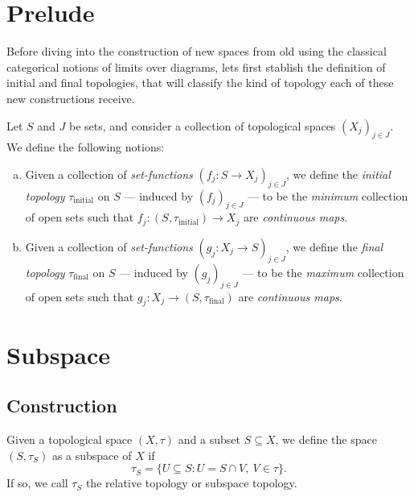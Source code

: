 \section{Prelude}

Before diving into the construction of new spaces from old using the classical
categorical notions of limits over diagrams, lets first stablish the definition
of initial and final topologies, that will classify the kind of topology each of
these new constructions receive.

\begin{definition}
\label{def:initial-final-topology}
Let \(S\) and \(J\) be sets, and consider a collection of topological spaces
\((X_j)_{j \in J}\). We define the following notions:
\begin{enumerate}[(a)]\setlength\itemsep{0em}
\item Given a collection of \emph{set-functions} \((f_j: S \to X_j)_{j \in J}\),
  we define the \emph{initial topology} \(\tau_{\text{initial}}\) on \(S\) ---
  induced by \((f_j)_{j \in J}\) --- to be the \emph{minimum} collection of open
  sets such that \(f_j: (S, \tau_{\text{initial}}) \to X_j\) are
  \emph{continuous maps}.
\item Given a collection of \emph{set-functions} \((g_j: X_j \to S)_{j \in J}\),
  we define the \emph{final topology} \(\tau_{\text{final}}\) on \(S\) ---
  induced by \((g_j)_{j \in J}\) --- to be the \emph{maximum} collection of open
  sets such that \(g_j: X_j \to (S, \tau_{\text{final}})\) are \emph{continuous
    maps}.
\end{enumerate}
\end{definition}

\section{Subspace}

\subsection{Construction}

\begin{definition}
\label{def: subspace topology}
Given a topological space \((X, \tau)\) and a subset \(S \subseteq X\),
we define the space \((S, \tau_S)\) as a subspace of \(X\) if
\[
  \tau_S = \{U \subseteq S \colon U = S \cap V,\ V \in \tau\}.
\]
If so, we call \(\tau_S\) the relative topology or subspace topology.
\end{definition}

